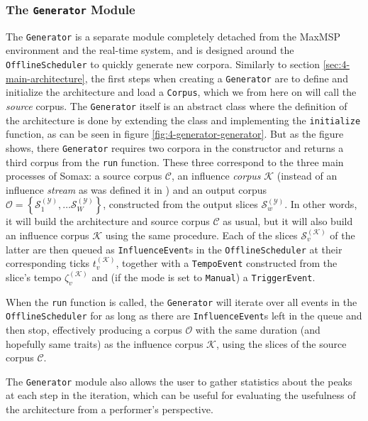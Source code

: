 \subsubsection{The \texttt{Generator} Module}\label{sec:4-generator-evaluator-generator}
The \texttt{Generator} is a separate module completely detached from the MaxMSP environment and the real-time system, and is designed around the \texttt{Offline\-Scheduler} to quickly generate new corpora. Similarly to section \ref{sec:4-main-architecture}, the first steps when creating a \texttt{Generator} are to define and initialize the architecture and load a \texttt{Corpus}, which we from here on will call the \textit{source} corpus. The \texttt{Generator} itself is an abstract class where the definition of the architecture is done by extending the class and implementing the \texttt{initialize} function, as can be seen in figure \ref{fig:4-generator-generator}. But as the figure shows, there \texttt{Generator} requires two corpora in the constructor and returns a third corpus from the \texttt{run} function. These three correspond to the three main processes of Somax: a source corpus $\mathcal C$, an influence \textit{corpus} $\mathcal K$ (instead of an influence \textit{stream} as was defined it in \cite{somaxtheory2021}) and an output corpus  $\mathcal O = \left\lbrace \mathcal S^{(\mathcal Y)}_1, \dots \mathcal S^{(\mathcal Y)}_W\right\rbrace$, constructed from the output slices $\mathcal S^{(\mathcal Y)}_w$. In other words, it will build the architecture and source corpus $\mathcal C$ as usual, but it will also build an influence corpus $\mathcal K$ using the same procedure. Each of the slices $\mathcal S^{(\mathcal K)}_v$ of the latter are then queued as \texttt{InfluenceEvent}s in the \texttt{OfflineScheduler} at their corresponding ticks $t^{(\mathcal K)}_v$, together with a \texttt{TempoEvent} constructed from the slice's tempo $\zeta^{(\mathcal K)}_v$ and (if the mode is set to \texttt{Manual}) a \texttt{TriggerEvent}.

When the \texttt{run} function is called, the \texttt{Generator} will iterate over all events in the \texttt{OfflineScheduler} for as long as there are \texttt{InfluenceEvent}s left in the queue and then stop, effectively producing a corpus $\mathcal O$ with the same duration (and hopefully same traits) as the influence corpus $\mathcal K$, using the slices of the source corpus $\mathcal C$.

The \texttt{Generator} module also allows the user to gather statistics about the peaks at each step in the iteration, which can be useful for evaluating the usefulness of the architecture from a performer's perspective.

